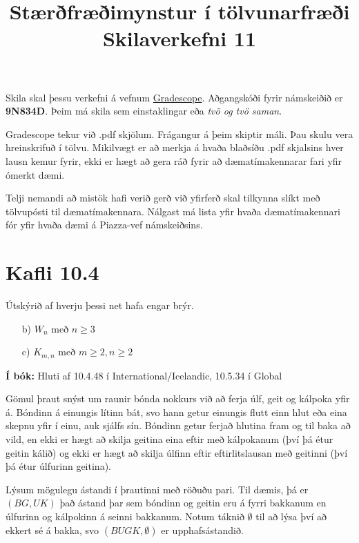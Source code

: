 \documentclass{article}
\title{Stærðfræðimynstur í tölvunarfræði \\ Skilaverkefni 11}
\author{}
\begin{document}
\maketitle

Skila skal þessu verkefni á vefnum \href{https://gradescope.com/courses/9487}{Gradescope}. Aðgangskóði fyrir námskeiðið er \textbf{9N834D}.
Þeim má skila sem einstaklingar eða \emph{tvö og tvö saman}.

Gradescope tekur við .pdf skjölum. Frágangur á þeim skiptir máli. Þau skulu vera hreinskrifuð í tölvu. 
Mikilvægt er að merkja á hvaða blaðsíðu .pdf skjalsins hver lausn kemur fyrir, ekki er hægt að gera ráð fyrir að dæmatímakennarar fari yfir ómerkt dæmi.

Telji nemandi að mistök hafi verið gerð við yfirferð skal tilkynna slíkt með tölvupósti til dæmatímakennara. Nálgast má lista yfir hvaða dæmatímakennari fór yfir hvaða dæmi á Piazza-vef námskeiðsins.
\section{Kafli 10.4}

\question Útskýrið af hverju þessi net hafa engar brýr.

\begin{itemize}
 \item[b)] $W_n$ með $n \geq 3$
 \item[c)] $K_{m,n}$ með $m \geq 2, n \geq 2$
\end{itemize}

\textbf{Í bók:} \quad Hluti af 10.4.48 í International/Icelandic, 10.5.34 í Global

\question Gömul þraut snýst um raunir bónda nokkurs við að ferja úlf, geit og kálpoka yfir á. Bóndinn á einungis lítinn bát, svo hann getur einungis flutt einn hlut eða eina skepnu yfir í einu, auk sjálfs sín. Bóndinn getur ferjað hlutina fram og til baka að vild, en ekki er hægt að skilja geitina eina eftir með kálpokanum (því þá étur geitin kálið) og ekki er hægt að skilja úlfinn eftir eftirlitslausan með geitinni (því þá étur úlfurinn geitina).

Lýsum mögulegu ástandi í þrautinni með röðuðu pari. Til dæmis, þá er $(BG,UK)$ það ástand þar sem bóndinn og geitin eru á fyrri bakkanum en úlfurinn og kálpokinn á seinni bakkanum. Notum táknið $\emptyset$ til að lýsa því að ekkert sé á bakka, svo $(BUGK, \emptyset)$ er upphafsástandið.
\end{document}

